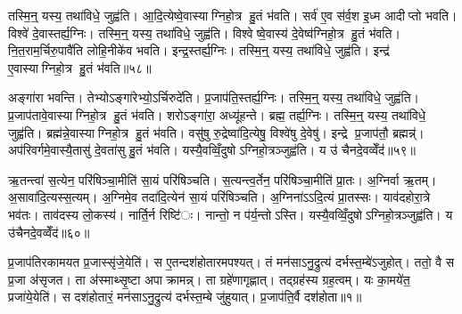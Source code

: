 तस्मि॒न्॒ यस्य॒ तथा॑विधे॒ जुह्व॑ति। आ॒दि॒त्येष्वे॒वास्याग्निहो॒त्र हु॒तं भ॑वति। सर्व॑ ए॒व स॑र्व॒श इ॒ध्म आदीप्तो भवति। विश्वे॑ दे॒वास्तर्ह्य॒ग्निः। तस्मि॒न्॒ यस्य॒ तथा॑विधे॒ जुह्व॑ति। विश्वेष्वे॒वास्य॑ दे॒वेष्व॑ग्निहो॒त्र हु॒तं भ॑वति। नि॒त॒राम॒र्चिरु॒पावै॑ति लोहि॒नीके॑व भवति। इन्द्र॒स्तर्ह्य॒ग्निः। तस्मि॒न्॒ यस्य॒ तथा॑विधे॒ जुह्व॑ति। इन्द्र॑ ए॒वास्याग्निहो॒त्र हु॒तं भ॑वति॥५८॥

अङ्गा॑रा भवन्ति। तेभ्योऽङ्गा॑रेभ्यो॒ऽर्चिरुदे॑ति। प्र॒जाप॑ति॒स्तर्ह्य॒ग्निः। तस्मि॒न्॒ यस्य॒ तथा॑विधे॒ जुह्व॑ति। प्र॒जाप॑तावे॒वास्याग्निहो॒त्र हु॒तं भ॑वति। शरोऽङ्गा॑रा॒ अध्यू॑हन्ते। ब्रह्म॒ तर्ह्य॒ग्निः। तस्मि॒न्॒ यस्य॒ तथा॑विधे॒ जुह्व॑ति। ब्रह्म॑न्ने॒वास्याग्निहो॒त्र हु॒तं भ॑वति। वसु॑षु रु॒द्रेष्वा॑दि॒त्येषु॒ विश्वे॑षु दे॒वेषु॑। इन्द्रे प्र॒जाप॑तौ॒ ब्रह्मन्न्॑। अप॑रिवर्गमे॒वास्यै॒तासु॑ दे॒वता॑सु हु॒तं भ॑वति। यस्यै॒वव्विँ॒दुषोऽग्निहो॒त्रञ्जुह्व॑ति। य उ॑ चैनदे॒वव्वेँद॑॥५९॥


ऋ॒तन्त्वा॑ स॒त्येन॒ परि॑षिञ्चा॒मीति॑ सा॒यं परि॑षिञ्चति। स॒त्यन्त्व॒र्तेन॒ परि॑षिञ्चा॒मीति॑ प्रा॒तः। अ॒ग्निर्वा ऋ॒तम्। अ॒सावा॑दि॒त्यस्स॒त्यम्। अ॒ग्निमे॒व तदा॑दि॒त्येन॑ सा॒यं परि॑षिञ्चति। अ॒ग्निना॑ऽऽदि॒त्यं प्रा॒तस्सः। याव॑दहोरा॒त्रे भव॑तः। ताव॑दस्य लो॒कस्य॑। नार्ति॒र्न रिष्टि॑ः। नान्तो॒ न प॑र्य॒न्तोऽस्ति। यस्यै॒वव्विँ॒दुषोऽग्निहो॒त्रञ्जुह्व॑ति। य उ॑चैनदे॒वव्वेँद॑॥६०॥




प्र॒जाप॑तिरकामयत प्र॒जास्सृ॑जे॒येति॑। स ए॒तन्दश॑होतारमपश्यत्। तं मन॑साऽनु॒द्रुत्य॑ दर्भस्त॒म्बे॑ऽजुहोत्। ततो॒ वै स प्र॒जा अ॑सृजत। ता अ॑स्माथ्सृ॒ष्टा अपाक्रामन्न्। ता ग्रहे॑णागृह्णात्। तद्ग्रह॑स्य ग्रह॒त्वम्। यः का॒मये॑त॒ प्रजा॑ये॒येति॑। स दश॑होतारं॒ मन॑साऽनु॒द्रुत्य॑ दर्भस्त॒म्बे जु॑हुयात्। प्र॒जाप॑ति॒र्वै दश॑होता॥१॥

